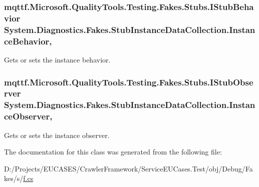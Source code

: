 \hypertarget{class_system_1_1_diagnostics_1_1_fakes_1_1_stub_instance_data_collection_a19c1b35e230c02926bd35cc7d6781e80}{
\subsubsection[{Instance\-Behavior}]{\setlength{\rightskip}{0pt plus 5cm}mqttf.\-Microsoft.\-Quality\-Tools.\-Testing.\-Fakes.\-Stubs.\-I\-Stub\-Behavior System.\-Diagnostics.\-Fakes.\-Stub\-Instance\-Data\-Collection.\-Instance\-Behavior\hspace{0.3cm}{\ttfamily [get]}, {\ttfamily [set]}}}\label{class_system_1_1_diagnostics_1_1_fakes_1_1_stub_instance_data_collection_a19c1b35e230c02926bd35cc7d6781e80}


Gets or sets the instance behavior.

\hypertarget{class_system_1_1_diagnostics_1_1_fakes_1_1_stub_instance_data_collection_aa2a38ab83ce764456aa5d4a0eb94edcb}{
\subsubsection[{Instance\-Observer}]{\setlength{\rightskip}{0pt plus 5cm}mqttf.\-Microsoft.\-Quality\-Tools.\-Testing.\-Fakes.\-Stubs.\-I\-Stub\-Observer System.\-Diagnostics.\-Fakes.\-Stub\-Instance\-Data\-Collection.\-Instance\-Observer\hspace{0.3cm}{\ttfamily [get]}, {\ttfamily [set]}}}\label{class_system_1_1_diagnostics_1_1_fakes_1_1_stub_instance_data_collection_aa2a38ab83ce764456aa5d4a0eb94edcb}


Gets or sets the instance observer.



The documentation for this class was generated from the following file\-:\begin{DoxyCompactItemize}
\item 
D\-:/\-Projects/\-E\-U\-C\-A\-S\-E\-S/\-Crawler\-Framework/\-Service\-E\-U\-Cases.\-Test/obj/\-Debug/\-Fakes/s/\hyperlink{s_2f_8cs}{f.\-cs}\end{DoxyCompactItemize}
